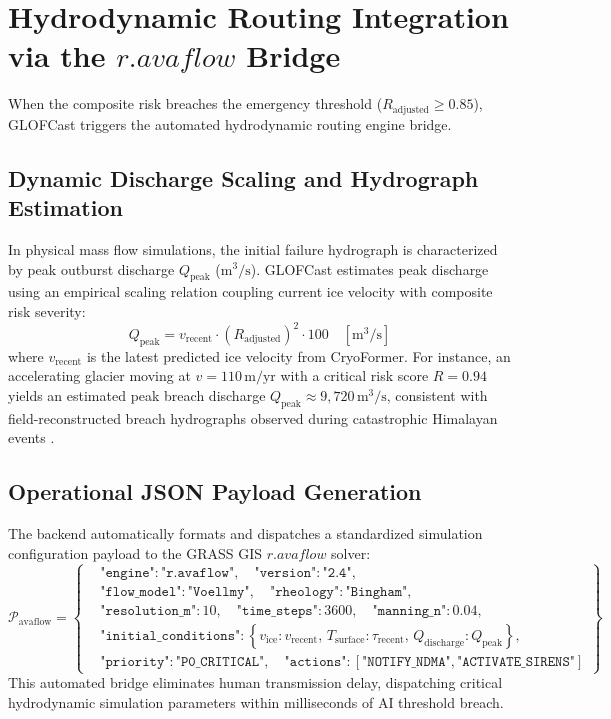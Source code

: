 \documentclass{mnnit}
\begin{document}
\section{Hydrodynamic Routing Integration via the $r.avaflow$ Bridge}
When the composite risk breaches the emergency threshold ($R_{\text{adjusted}} \ge 0.85$), GLOFCast triggers the automated hydrodynamic routing engine bridge.

\subsection{Dynamic Discharge Scaling and Hydrograph Estimation}
In physical mass flow simulations, the initial failure hydrograph is characterized by peak outburst discharge $Q_{\text{peak}}$ ($\text{m}^3/\text{s}$). GLOFCast estimates peak discharge using an empirical scaling relation coupling current ice velocity with composite risk severity:
\begin{equation}
    Q_{\text{peak}} = v_{\text{recent}} \cdot \left(R_{\text{adjusted}}\right)^2 \cdot 100 \quad \left[\text{m}^3/\text{s}\right]
    \label{eq:q_peak}
\end{equation}
where $v_{\text{recent}}$ is the latest predicted ice velocity from CryoFormer. For instance, an accelerating glacier moving at $v = 110\,\text{m/yr}$ with a critical risk score $R = 0.94$ yields an estimated peak breach discharge $Q_{\text{peak}} \approx 9,720\,\text{m}^3/\text{s}$, consistent with field-reconstructed breach hydrographs observed during catastrophic Himalayan events \cite{sattar2021numerical, babu2024southlhonak}.

\subsection{Operational JSON Payload Generation}
The backend automatically formats and dispatches a standardized simulation configuration payload to the GRASS GIS $r.avaflow$ solver:
\begin{equation}
    \mathcal{P}_{\text{avaflow}} = \left\{
    \begin{aligned}
        &\texttt{"engine"}: \texttt{"r.avaflow"}, \quad \texttt{"version"}: \texttt{"2.4"}, \\
        &\texttt{"flow\_model"}: \texttt{"Voellmy"}, \quad \texttt{"rheology"}: \texttt{"Bingham"}, \\
        &\texttt{"resolution\_m"}: 10, \quad \texttt{"time\_steps"}: 3600, \quad \texttt{"manning\_n"}: 0.04, \\
        &\texttt{"initial\_conditions"}: \left\{v_{\text{ice}}: v_{\text{recent}}, \, T_{\text{surface}}: \tau_{\text{recent}}, \, Q_{\text{discharge}}: Q_{\text{peak}}\right\}, \\
        &\texttt{"priority"}: \texttt{"P0\_CRITICAL"}, \quad \texttt{"actions"}: [\texttt{"NOTIFY\_NDMA"}, \texttt{"ACTIVATE\_SIRENS"}]
    \end{aligned}
    \right\}
\end{equation}
This automated bridge eliminates human transmission delay, dispatching critical hydrodynamic simulation parameters within milliseconds of AI threshold breach.
\end{document}
